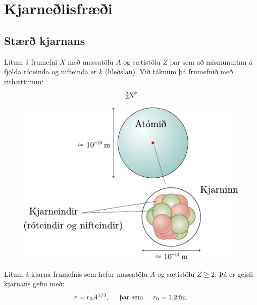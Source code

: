 \chapter{Kjarneðlisfræði}

\section{Stærð kjarnans}

\begin{tcolorbox}
\begin{definition}
Lítum á frumefni $X$ með massatölu $A$ og sætistölu $Z$ þar sem að mismunurinn á fjölda róteinda og nifteinda er $k$ (hleðslan). Við táknum þá frumefnið með rithættinum:
\begin{align*}
    \ce{^{A}_{Z}X^{k}}
\end{align*}
\end{definition}
\end{tcolorbox}

\begin{figure}[H]
    \centering
    \includegraphics[scale = 1]{figures/atomid-staerd.pdf}
\end{figure}

\begin{tcolorbox}
\begin{theorem}
Lítum á kjarna frumefnis sem hefur massatölu $A$ og sætistölu $Z \geq 2$. Þá er geisli kjarnans gefin með:
\begin{align*}
    r = r_0 A^{1/3}, \hspace{0.5cm} \text{þar sem} \hspace{0.5cm} r_0 = \SI{1.2}{fm}.
\end{align*}
\end{theorem}
\end{tcolorbox}


